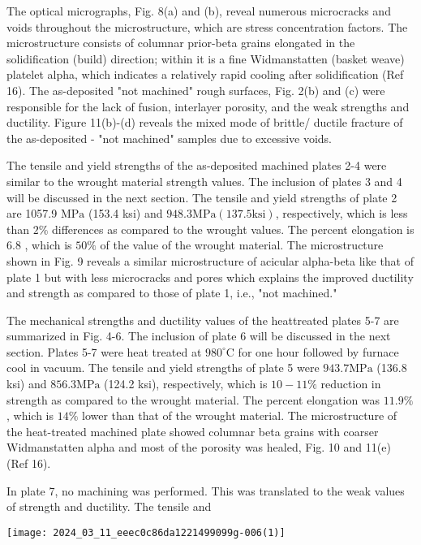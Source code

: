 \documentclass[10pt]{article}
\begin{document}
The optical micrographs, Fig. 8(a) and (b), reveal numerous microcracks and voids throughout the microstructure, which are stress concentration factors. The microstructure consists of columnar prior-beta grains elongated in the solidification (build) direction; within it is a fine Widmanstatten (basket weave) platelet alpha, which indicates a relatively rapid cooling after solidification (Ref 16). The as-deposited "not machined" rough surfaces, Fig. 2(b) and (c) were responsible for the lack of fusion, interlayer porosity, and the weak strengths and ductility. Figure 11(b)-(d) reveals the mixed mode of brittle/ ductile fracture of the as-deposited - "not machined" samples due to excessive voids.

The tensile and yield strengths of the as-deposited machined plates 2-4 were similar to the wrought material strength values. The inclusion of plates 3 and 4 will be discussed in the next section. The tensile and yield strengths of plate 2 are 1057.9 $\mathrm{MPa}$ (153.4 ksi) and $948.3 \mathrm{MPa}(137.5 \mathrm{ksi})$, respectively, which is less than $2 \%$ differences as compared to the wrought values. The percent elongation is 6.8 , which is $50 \%$ of the value of the wrought material. The microstructure shown in Fig. 9 reveals a similar microstructure of acicular alpha-beta like that of plate 1 but with less microcracks and pores which explains the improved ductility and strength as compared to those of plate 1, i.e., "not machined."

The mechanical strengths and ductility values of the heattreated plates 5-7 are summarized in Fig. 4-6. The inclusion of plate 6 will be discussed in the next section. Plates 5-7 were heat treated at $980^{\circ} \mathrm{C}$ for one hour followed by furnace cool in vacuum. The tensile and yield strengths of plate 5 were $943.7 \mathrm{MPa}$ (136.8 ksi) and $856.3 \mathrm{MPa}$ (124.2 ksi), respectively, which is $10-11 \%$ reduction in strength as compared to the wrought material. The percent elongation was $11.9 \%$, which is $14 \%$ lower than that of the wrought material. The microstructure of the heat-treated machined plate showed columnar beta grains with coarser Widmanstatten alpha and most of the porosity was healed, Fig. 10 and 11(e) (Ref 16).

In plate 7, no machining was performed. This was translated to the weak values of strength and ductility. The tensile and

\begin{center}
\texttt{[image: 2024\_03\_11\_eeec0c86da1221499099g-006(1)]}
\end{center}
\end{document}
